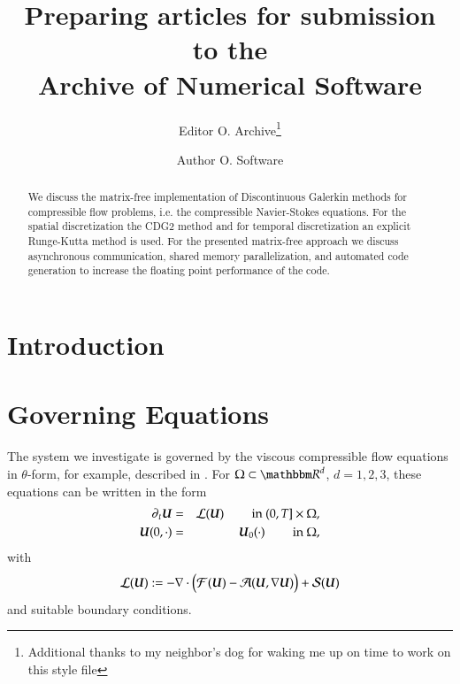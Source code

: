 \documentclass{ansarticle}
\title{Preparing articles for submission to the \\
       Archive of Numerical Software}
\author[1]{Editor O. Archive\thanks{Additional thanks to my neighbor's dog
  for waking me up on time to work on this style file}}
\author[2]{Author O. Software}
\affil[1]{The Archive of Numerical Software}
\affil[2]{The Worlds Best Place for Numerical Software}
\begin{document}
\maketitle

\begin{abstract}
We discuss the matrix-free
implementation of Discontinuous Galerkin methods for compressible flow
problems, i.e. the compressible Navier-Stokes equations. For the spatial discretization
the CDG2 method and for temporal discretization an explicit Runge-Kutta method is used.
For the presented matrix-free approach we discuss asynchronous communication,
shared memory parallelization, and automated code generation to increase the
floating point performance of the code.
\end{abstract}

\section{Introduction}



\section{Governing Equations}
\label{sec:equations}
The system we investigate is governed by the
viscous compressible flow equations in $\theta$-form,
for example, described in \cite{GR08}.
For $\Omega \subset \RRR^d$, $d=1,2,3$, these equations can be written in the form
\begin{eqnarray}
\label{eqn:general}
\label{eqn:ns}
\partial_t \boldsymbol{U}  &=& \mathcal{L}(\boldsymbol{U}) \qquad \mbox{ in } (0,T] \times \Omega, \\
\boldsymbol{U}(0,\cdot) &=& \boldsymbol{U}_0(\cdot) \qquad  \mbox{ in } \Omega, \nonumber 
\end{eqnarray}
with $$\mathcal{L}(\boldsymbol{U}) := - \nabla \cdot\big( \mathcal{F}(\boldsymbol{U}) -
\mathcal{A}(\boldsymbol{U},\nabla\boldsymbol{U}) \big) + \mathcal{S}(\boldsymbol{U})$$
and suitable boundary conditions.
\end{document}
